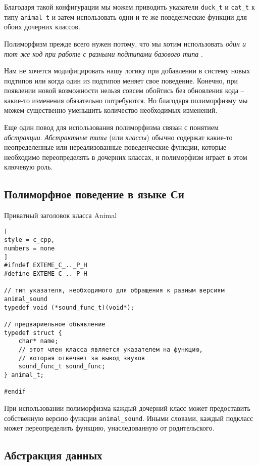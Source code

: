 \documentclass[%
	11pt,
	a4paper,
	utf8,
		]{article}
\begin{document}
Благодаря такой конфигурации мы можем приводить указатели \verb|duck_t| и \verb|cat_t| к типу \verb|animal_t| и затем использовать одни и те же поведенческие функции для обоих дочерних классов.

Полиморфизм прежде всего нужен потому, что мы хотим использовать \emph{один и тот же код при работе с разными подтипами базового типа} \cite[]{amini-extreme-c:2022}.

Нам не хочется модифицировать нашу логику при добавлении в систему новых подтипов или когда один из подтипов меняет свое поведение. Конечно, при появлении новой возможности нельзя совсем обойтись без обновления кода -- какие-то изменения обязательно потребуются. Но благодаря полиморфизму мы можем существенно уменьшить количество необходимых изменений.

Еще один повод для использования полиморфизма связан с понятием \emph{абстракции}. \emph{Абстрактные типы} (или \emph{классы}) обычно содержат какие-то неопределенные или нереализованные поведенческие функции, которые необходимо переопределять в дочерних классах, и полиморфизм играет в этом ключевую роль.

\subsection{Полиморфное поведение в языке Си}

Приватный заголовок класса Animal
\begin{lstlisting}[
style = c_cpp,
numbers = none
]
#ifndef EXTEME_C_.._P_H
#define EXTEME_C_.._P_H

// тип указателя, необходимого для обращения к разным версиям animal_sound
typedef void (*sound_func_t)(void*);

// предвариельное объявление
typedef struct {
    char* name;
    // этот член класса является указателем на функцию,
    // которая отвечает за вывод звуков
    sound_func_t sound_func;
} animal_t;

#endif
\end{lstlisting}

При использовании полиморфизма каждый дочерний класс может предоставить собственную версию функции \verb|animal_sound|. Иными словами, каждый подкласс может переопределить функцию, унаследованную от родительского.

\subsection{Абстракция данных}
\end{document}
